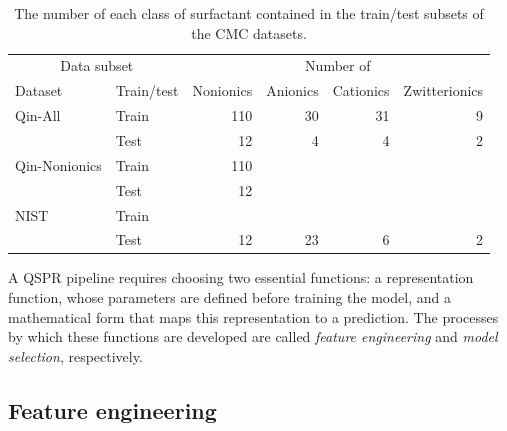 \begin{table}
    \centering
    \caption{The number of each class of surfactant contained in the train/test subsets of the CMC datasets.}
    \label{tab:data-split}
    \begin{tabular}{@{}llrrrr@{}} \toprule \multicolumn{2}{c}{Data subset} & \multicolumn{4}{c}{Number of}                                                    \\\cmidrule(r){1-2}\cmidrule(l){3-6}
               Dataset                                                 & Train/test                    & Nonionics & Anionics & Cationics & Zwitterionics \\\midrule
               Qin-All                                                 & Train                         & 110       & 30       & 31        & 9             \\
                                                                       & Test                          & 12        & 4        & 4         & 2             \\
               Qin-Nonionics                                           & Train                         & 110       &          &           &               \\
                                                                       & Test                          & 12        &          &           &               \\
               NIST                                                    & Train                         &           &          &           &               \\
                                                                       & Test                          & 12        & 23       & 6         & 2             \\\bottomrule
    \end{tabular}
\end{table}

A QSPR pipeline requires choosing two essential functions: a representation function, whose parameters are defined before training the model, and a mathematical form that maps this representation to a prediction. The processes
by which these functions are developed are called \emph{feature engineering} and \emph{model selection}, respectively.

\subsection{Feature engineering}

